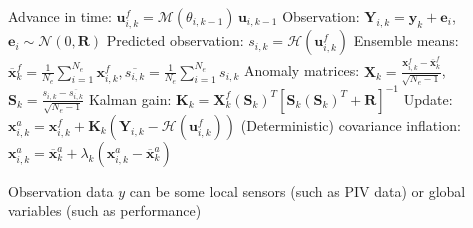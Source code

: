 \begin{algorithm}[!ht]
\begin{algorithmic}[1]
                \State Advance in time: $\boldsymbol{u}_{i,k}^f = \mathcal{M}(\theta_{i,k-1})\,\boldsymbol{u}_{i,k-1}$
                \State Observation: $\boldsymbol{Y}_{i,k} = \boldsymbol{y}_k + \boldsymbol{e}_i$, $\boldsymbol{e}_i \sim \mathcal{N}(0,\boldsymbol{R})$
                \State Predicted observation: $s_{i,k} = \mathcal{H}(\boldsymbol{u}_{i,k}^f)$
                \State Ensemble means: $\boldsymbol{\overline{x}}_k^{f} = \frac{1}{N_e}\sum_{i=1}^{N_e}\boldsymbol{x}_{i,k}^{f}, \overline{s_{i,k}} = \frac{1}{N_e}\sum_{i = 1}^{N_e} s_{i,k}$
                \State Anomaly matrices: $\boldsymbol{X}_k = \frac{\boldsymbol{x}_{i,k}^{f} - \boldsymbol{\overline{x}}_k^{f}}{\sqrt{N_e - 1}}$,\,$\boldsymbol{S}_k = \frac{s_{i,k} - \overline{s_{i,k}}}{\sqrt{N_e-1}}$
                \State Kalman gain: $\boldsymbol{K}_k = \boldsymbol{X}_k^f(\boldsymbol{S}_k)^T [\boldsymbol{S}_k(\boldsymbol{S}_k)^T + \boldsymbol{R}]^{-1}$ %
                \State Update: $\boldsymbol{x}_{i,k}^{a} = \boldsymbol{x}_{i,k}^{f} + \boldsymbol{K}_k (\boldsymbol{Y}_{i,k} - \mathcal{H}(\boldsymbol{u}_{i,k}^f))$
                \State (Deterministic) covariance inflation: $\boldsymbol{x}_{i,k}^{a} = \boldsymbol{\overline{x}}_k^{a} + \lambda_k (\boldsymbol{x}_{i,k}^{a} - \boldsymbol{\overline{x}}_k^{a})$
            \EndFor
        \EndFor
    \end{algorithmic}
\end{algorithm}

Observation data $y$ can be some local sensors (such as PIV data) or global variables (such as performance)

